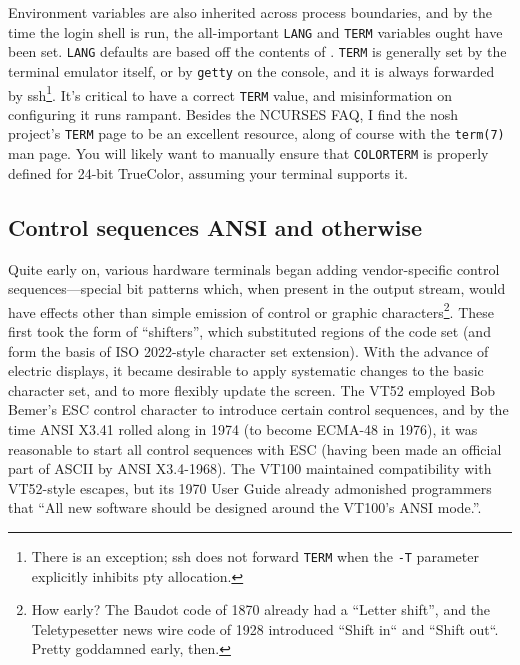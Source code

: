 Environment variables are also inherited across process boundaries, and by the
time the login shell is run, the all-important \texttt{LANG} and \texttt{TERM}
variables ought have been set. \texttt{LANG} defaults are based off the contents
of . \texttt{TERM} is generally set by the terminal emulator itself,
or by \texttt{getty} on the console, and it is always forwarded by ssh\footnote{There is an exception; ssh does not forward \texttt{TERM} when the \texttt{-T}
parameter explicitly inhibits pty allocation.}. It's critical to have a correct \texttt{TERM}
value, and misinformation on configuring it runs rampant. Besides the NCURSES FAQ\cite{ncursesfaq},
I find the nosh project's \texttt{TERM} page\cite{noshterm} to be an excellent
resource, along of course with the \texttt{term(7)} man page\cite{term7}. You
will likely want to manually ensure that \texttt{COLORTERM} is properly defined
for 24-bit TrueColor, assuming your terminal supports it.

\subsection{Control sequences ANSI and otherwise}
\label{sec:escapes}
Quite early on, various hardware terminals began adding vendor-specific control
sequences---special bit patterns which, when present in the output stream,
would have effects other than simple emission of control or graphic
characters\footnote{How early? The Baudot code of 1870 already had a ``Letter
shift'', and the Teletypesetter news wire code of 1928 introduced ``Shift
in`` and ``Shift out``. Pretty goddamned early, then.}. These first took the
form of ``shifters'', which substituted regions of the code set (and form the
basis of ISO 2022-style character set extension). With the advance of electric
displays, it became desirable to apply systematic changes to the basic
character set, and to more flexibly update the screen. The VT52 employed Bob
Bemer's ESC control character\cite{bemeresc} to introduce certain control
sequences, and by the time ANSI X3.41 rolled along in 1974 (to become ECMA-48 in
1976), it was reasonable to start all control sequences with ESC (having been
made an official part of ASCII by ANSI X3.4-1968). The VT100 maintained
compatibility with VT52-style escapes, but its 1970 User Guide already
admonished programmers that ``All new software should be designed around the
VT100's ANSI mode.''\cite{vt100}.

